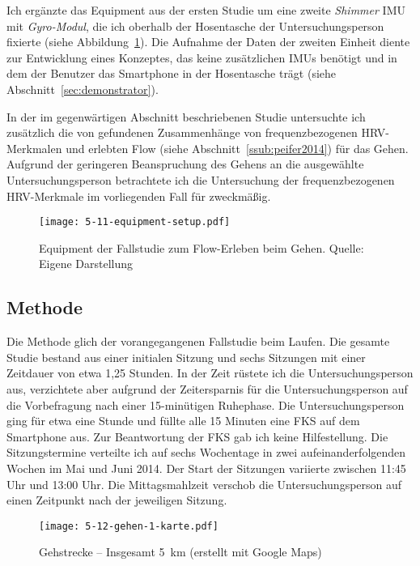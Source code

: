 Ich ergänzte das Equipment aus der ersten Studie um eine zweite \emph{Shimmer} \ac{IMU} mit \emph{Gyro-Modul}, die ich oberhalb der Hosentasche der Untersuchungsperson fixierte (siehe Abbildung~\ref{fig:5_11_equipment_setup}). Die Aufnahme der Daten der zweiten Einheit diente zur Entwicklung eines Konzeptes, das keine zusätzlichen \acp{IMU} benötigt und in dem der Benutzer das Smartphone in der Hosentasche trägt (siehe Abschnitt~\ref{sec:demonstrator}).

In der im gegenwärtigen Abschnitt beschriebenen Studie untersuchte ich zusätzlich die von \citet{Peifer2014} gefundenen Zusammenhänge von frequenzbezogenen \ac{HRV}-Merkmalen und erlebten Flow (siehe Abschnitt~\ref{ssub:peifer2014}) für das Gehen. Aufgrund der geringeren Beanspruchung des Gehens an die ausgewählte Untersuchungsperson betrachtete ich die Untersuchung der frequenzbezogenen \ac{HRV}-Merkmale im vorliegenden Fall für zweckmäßig.

\begin{figure}[t]
	\centering
		\texttt{[image: 5-11-equipment-setup.pdf]}
	\caption[Equipment der Fallstudie zum Flow-Erleben beim Gehen]{Equipment der Fallstudie zum Flow-Erleben beim Gehen. Quelle: Eigene Darstellung}
	\label{fig:5_11_equipment_setup}
\end{figure}

\subsection{Methode}
Die Methode glich der vorangegangenen Fallstudie beim Laufen. Die gesamte Studie bestand aus einer initialen Sitzung und sechs Sitzungen mit einer Zeitdauer von etwa 1,25 Stunden. In der Zeit rüstete ich die Untersuchungsperson aus, verzichtete aber aufgrund der Zeitersparnis für die Untersuchungsperson auf die Vorbefragung nach einer 15-minütigen Ruhephase. Die Untersuchungsperson ging für etwa eine Stunde und füllte alle 15 Minuten eine \ac{FKS} auf dem Smartphone aus. Zur Beantwortung der \ac{FKS} gab ich keine Hilfestellung. Die Sitzungstermine verteilte ich auf sechs Wochentage in zwei aufeinanderfolgenden Wochen im Mai und Juni 2014. Der Start der Sitzungen variierte zwischen 11:45 Uhr und 13:00 Uhr. Die Mittagsmahlzeit verschob die Untersuchungsperson auf einen Zeitpunkt nach der jeweiligen Sitzung.

\begin{figure}[t]
	\centering
		\texttt{[image: 5-12-gehen-1-karte.pdf]}
	\caption[Gehstrecke]{Gehstrecke -- Insgesamt 5~km (erstellt mit Google Maps)}
	\label{fig:5-12-gehen-1-karte}
\end{figure}

